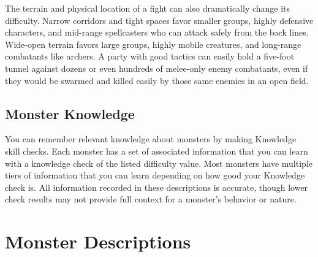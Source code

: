         The terrain and physical location of a fight can also dramatically change its difficulty.
        Narrow corridors and tight spaces favor smaller groups, highly defensive characters, and mid-range spellcasters who can attack safely from the back lines.
        Wide-open terrain favors large groups, highly mobile creatures, and long-range combatants like archers.
        A party with good tactics can easily hold a five-foot tunnel against dozens or even hundreds of melee-only enemy combatants, even if they would be swarmed and killed easily by those same enemies in an open field.

    \subsection{Monster Knowledge}
        You can remember relevant knowledge about monsters by making Knowledge skill checks.
        Each monster has a set of associated information that you can learn with a knowledge check of the listed difficulty value.
        Most monsters have multiple tiers of information that you can learn depending on how good your Knowledge check is.
        All information recorded in these descriptions is accurate, though lower check results may not provide full context for a monster's behavior or nature.

\section{Monster Descriptions}


